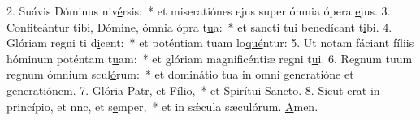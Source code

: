 2. Suávis Dóminus niv\uline{é}rsis:~* et miseratiónes ejus super ómnia ópera \uline{e}jus.
3. Confiteántur tibi, Dómine, ómnia ópra t\uline{u}a:~* et sancti tui benedícant t\uline{i}bi.
4. Glóriam regni ti d\uline{i}cent:~* et poténtiam tuam lo\uline{qué}ntur:
5. Ut notam fáciant fíliis hóminum poténtam t\uline{u}am:~* et glóriam magnificéntiæ regni t\uline{u}i.
6. Regnum tuum regnum ómnium scul\uline{ó}rum:~* et dominátio tua in omni generatióne et generati\uline{ó}nem.
7. Glória Patr, et F\uline{í}lio,~* et Spirítui S\uline{a}ncto.
8. Sicut erat in princípio, et nnc, et s\uline{e}mper,~* et in sǽcula sæculórum. \uline{A}men.
